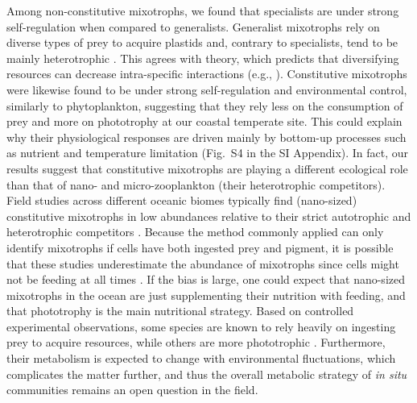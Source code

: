 \documentclass[12pt]{article}
\begin{document}
Among non-constitutive mixotrophs, we found that specialists are under strong self-regulation when compared to generalists. Generalist mixotrophs rely on diverse types of prey to acquire plastids and, contrary to specialists, tend to be mainly heterotrophic \citep{Mitra2016}. This agrees with theory, which predicts that diversifying resources can decrease intra-specific interactions (e.g., \citealp{Svanback2008,Svanback2007}). Constitutive mixotrophs were likewise found to be under strong self-regulation and environmental control, similarly to phytoplankton, suggesting that they rely less on the consumption of prey and more on phototrophy at our coastal temperate site. This could explain why their physiological responses are driven mainly by bottom-up processes such as nutrient and temperature limitation (Fig.~S4 in the SI Appendix). In fact, our results suggest that constitutive mixotrophs are playing a different ecological role than that of nano- and micro-zooplankton (their heterotrophic competitors). Field studies across different oceanic biomes typically find (nano-sized) constitutive mixotrophs in low abundances relative to their strict autotrophic and heterotrophic competitors \citep{Edwards2019}. Because the method commonly applied can only identify mixotrophs if cells have both ingested prey and pigment, it is possible that these studies underestimate the abundance of mixotrophs since cells might not be feeding at all times \citep{beisner2019guide}. If the bias is large, one could expect that nano-sized mixotrophs in the ocean are just supplementing their nutrition with feeding, and that phototrophy is the main nutritional strategy. Based on controlled experimental observations, some species are known to rely heavily on ingesting prey to acquire resources, while others are more phototrophic \citep{wilken2020contrasting}. Furthermore, their metabolism is expected to change with environmental fluctuations, which complicates the matter further, and thus the overall metabolic strategy of \textit{in situ} communities remains an open question in the field.
\end{document}
